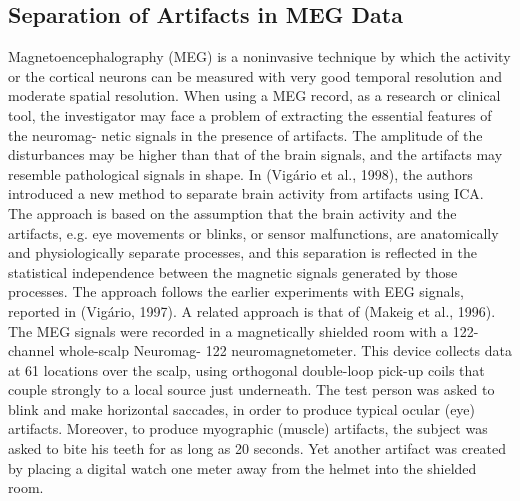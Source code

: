 \documentclass[12pt, a4paper, onecolumn]{IEEEtran}
\begin{document}
\subsection{Separation of Artifacts in MEG Data}
Magnetoencephalography (MEG) is a noninvasive technique by which the activity or the cortical neurons can be measured with very good temporal resolution and moderate spatial resolution. When using a MEG record, as a research or clinical tool, the investigator may face a problem of extracting the essential features of the neuromag- netic signals in the presence of artifacts. The amplitude of the disturbances may be higher than that of the brain signals, and the artifacts may resemble pathological signals in shape.
In (Vigário et al., 1998), the authors introduced a new method to separate brain activity from artifacts using ICA. The approach is based on the assumption that the brain activity and the artifacts, e.g. eye movements or blinks, or sensor malfunctions, are anatomically and physiologically separate processes, and this separation is reflected in the statistical independence between the magnetic signals generated by those processes. The approach follows the earlier experiments with EEG signals, reported in (Vigário, 1997). A related approach is that of (Makeig et al., 1996).
The MEG signals were recorded in a magnetically shielded room with a 122-channel whole-scalp Neuromag- 122 neuromagnetometer. This device collects data at 61 locations over the scalp, using orthogonal double-loop pick-up coils that couple strongly to a local source just underneath. The test person was asked to blink and make horizontal saccades, in order to produce typical ocular (eye) artifacts. Moreover, to produce myographic (muscle)
artifacts, the subject was asked to bite his teeth for as long as 20 seconds. Yet another artifact was created by placing a digital watch one meter away from the helmet into the shielded room.
\end{document}

